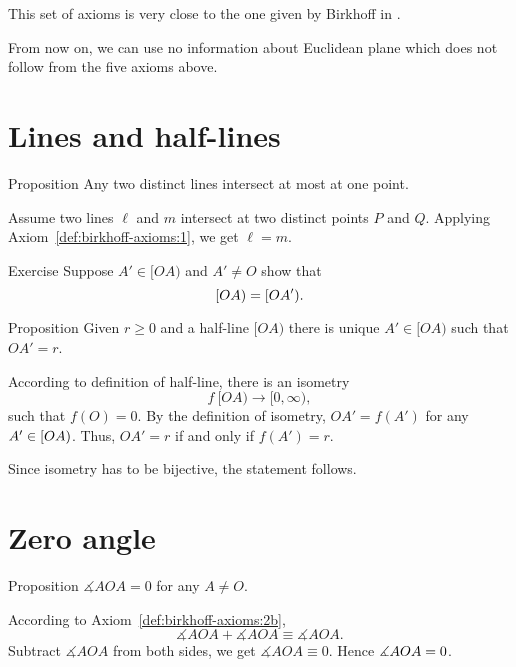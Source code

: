 \bigskip 


This set of axioms is very close to the one given by Birkhoff in \cite{birkhoff}.

From now on,  
we can use no information about Euclidean plane which does not follow from the five axioms above.

\section*{Lines and half-lines}

\begin{thm}{Proposition}\label{lem:line-line}
Any two distinct lines intersect at most at one point.
\end{thm}

Assume two lines $\ell$ and $m$ intersect at two distinct points $P$ and $Q$.
Applying Axiom~\ref{def:birkhoff-axioms:1}, we get $\ell=m$.
\qeds

\begin{thm}{Exercise}\label{ex:[OA)=[OA')}
Suppose $A'\in[OA)$ and $A'\not=O$ show that 
\[[O A)\z=[O A').\]

\end{thm}

\begin{thm}{Proposition}\label{prop:point-on-half-line}
Given $r\ge 0$ and a half-line $[O A)$ there is unique $A'\in [O A)$  such that $O A'=r$.
\end{thm}

According to definition of half-line, 
there is an isometry 
$$f\:[O A)\to [0,\infty),$$
such that $f(O)=0$.
By the definition of isometry, $O A'=f(A')$ for any $A'\z\in [O A)$.
Thus, $O A'=r$ if and only if $f(A')=r$.

Since isometry has to be bijective, the statement follows.
\qeds

\section*{Zero angle}

\begin{thm}{Proposition}\label{lem:AOA=0}
$\measuredangle A O A= 0$ for any $A\not=O$.
\end{thm}

According to Axiom~\ref{def:birkhoff-axioms:2b},
$$\measuredangle A O A
+
\measuredangle A O A 
\equiv
\measuredangle A O A.$$
Subtract  $\measuredangle A O A$ from both sides, we get 
$\measuredangle A O A \equiv 0$.
Hence $\measuredangle A O A \z= 0$.
\qeds

